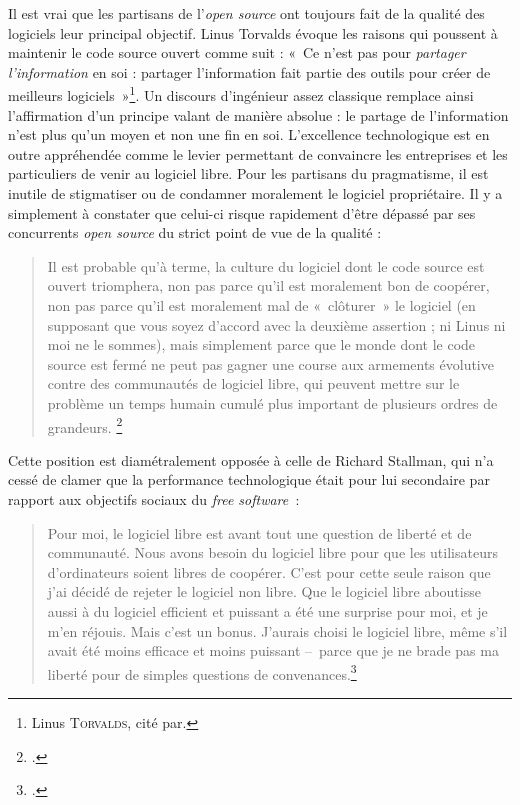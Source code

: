 \documentclass{FramateX}
\begin{document}
\begin{refsection}
Il est vrai que les partisans de l'\textit{open source} ont toujours
fait de la qualité des logiciels leur principal objectif. Linus
Torvalds évoque les raisons qui poussent à maintenir le code source
ouvert comme suit : «~Ce n'est pas pour \textit{partager l'information}
en soi : partager l'information fait partie des outils pour créer de
meilleurs logiciels~»\footnote{Linus \textsc{Torvalds}, cité par\cite{byfieldlinus2007}.}. Un discours
d'ingénieur assez classique remplace ainsi
l'affirmation d'un principe valant de
manière absolue : le partage de l'information
n'est plus qu'un moyen et
non une fin en soi. L'excellence technologique est en outre appréhendée
comme le levier permettant de convaincre les entreprises et les
particuliers de venir au logiciel libre. Pour les partisans du
pragmatisme, il est inutile de stigmatiser ou de condamner moralement
le logiciel propriétaire. Il y a simplement à constater que celui-ci
risque rapidement d'être dépassé par ses concurrents
\textit{open source} du strict point de vue de la qualité :


\begin{quote}
Il est probable qu'à terme, la culture du logiciel dont le code
source est ouvert triomphera, non pas parce qu'il est moralement bon de
coopérer, non pas parce qu'il est moralement mal de «~clôturer~» le
logiciel (en supposant que vous soyez d'accord avec la deuxième
assertion ; ni Linus ni moi ne le sommes), mais simplement parce que le
monde dont le code source est fermé ne peut pas gagner une course aux
armements évolutive contre des communautés de logiciel libre, qui
peuvent mettre sur le  problème un temps humain cumulé plus
important de plusieurs ordres de grandeurs. \footnote{\cite{raymondcathedral2001}.}
\end{quote}



Cette position est diamétralement opposée à celle de Richard Stallman,
qui n'a cessé de clamer que la performance technologique était pour lui
secondaire par rapport aux objectifs sociaux du \textit{free
software~}:


\begin{quote}
Pour moi, le logiciel libre est avant tout une question de
liberté et de communauté. Nous avons besoin du logiciel libre pour que
les utilisateurs d'ordinateurs soient libres de
coopérer. C'est pour cette seule raison que
j'ai décidé de rejeter le logiciel non libre. Que le
logiciel libre aboutisse aussi à du logiciel efficient et puissant a
été une surprise pour moi, et je m'en réjouis. Mais
c'est un bonus. J'aurais choisi le
logiciel libre, même s'il avait été moins efficace et
moins puissant –~parce que je ne brade pas ma liberté pour de simples
questions de convenances.\footnote{\cite{stallmanpassion2000}.}
\end{quote}



\end{refsection}
\end{document}
